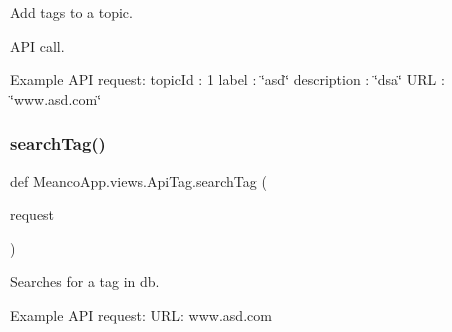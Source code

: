 Add tags to a topic. 

A\+PI call.

Example A\+PI request\+: topic\+Id \+: 1 label \+: \char`\"{}asd\char`\"{} description \+: \char`\"{}dsa\char`\"{} U\+RL \+: \char`\"{}www.\+asd.\+com\char`\"{} \hypertarget{namespace_meanco_app_1_1views_1_1_api_tag_acd69ccc1145d97e4decbaab3092df35d}{}\label{namespace_meanco_app_1_1views_1_1_api_tag_acd69ccc1145d97e4decbaab3092df35d} 
\subsubsection{\texorpdfstring{search\+Tag()}{searchTag()}}
{\footnotesize\ttfamily def Meanco\+App.\+views.\+Api\+Tag.\+search\+Tag (\begin{DoxyParamCaption}\item[{}]{request }\end{DoxyParamCaption})}



Searches for a tag in db. 

Example A\+PI request\+: U\+RL\+: www.\+asd.\+com 